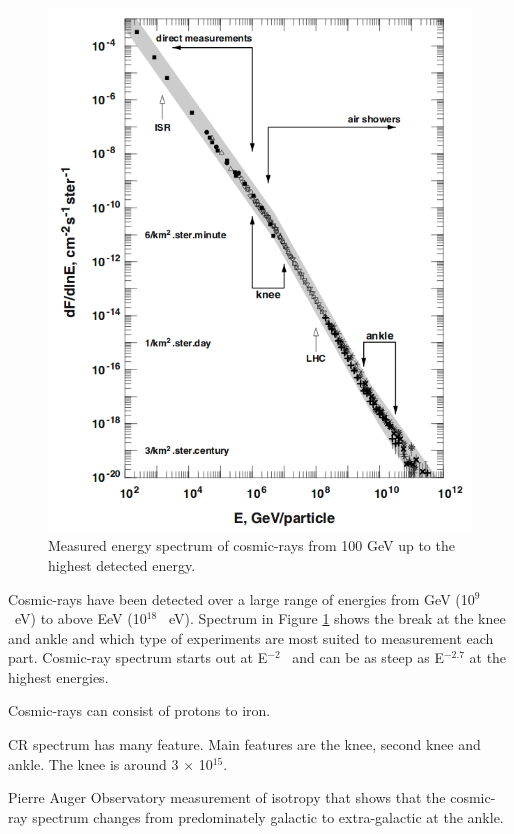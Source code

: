 \begin{figure}[hp]
\centering
\includegraphics[width=\textwidth]{chapters/pix/CosmicRay_Spectrum.png}
\caption{Measured energy spectrum of cosmic-rays from 100 GeV up to the highest detected energy.}
\label{fig:CR_Spectrum}
\end{figure}

Cosmic-rays have been detected over a large range of energies from GeV (10$^9$ \ eV) to above EeV (10$^18$ \ eV). Spectrum in Figure \ref{fig:CR_Spectrum} shows the break at the knee and ankle and which type of experiments are most suited to measurement each part. Cosmic-ray spectrum starts out at E$^{-2}$ \ and can be as steep as E$^{-2.7}$ at the highest energies.

Cosmic-rays can consist of protons to iron. 

CR spectrum has many feature. Main features are the knee, second knee and ankle. The knee is around 3 $\times$ 10$^{15}$.

Pierre Auger Observatory measurement of isotropy that shows that the cosmic-ray spectrum changes from predominately galactic to extra-galactic at the ankle.


